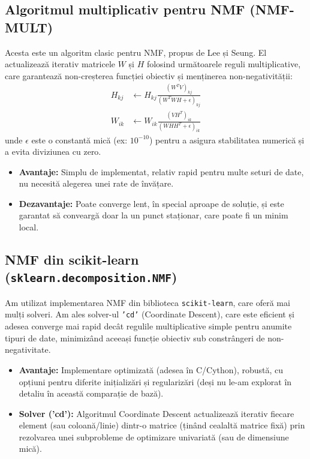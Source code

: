 \documentclass[12pt,a4paper]{article}
\begin{document}
	\subsection{Algoritmul multiplicativ pentru NMF (NMF-MULT)}
	Acesta este un algoritm clasic pentru NMF, propus de Lee și Seung. El actualizează iterativ matricele $W$ și $H$ folosind următoarele reguli multiplicative, care garantează non-creșterea funcției obiectiv și menținerea non-negativității:
	\begin{align}
		H_{kj} &\leftarrow H_{kj} \frac{(W^T V)_{kj}}{(W^T W H + \epsilon)_{kj}} \\
		W_{ik} &\leftarrow W_{ik} \frac{(V H^T)_{ik}}{(W H H^T + \epsilon)_{ik}}
	\end{align}
	unde $\epsilon$ este o constantă mică (ex: $10^{-10}$) pentru a asigura stabilitatea numerică și a evita diviziunea cu zero.
	\begin{itemize}
		\item \textbf{Avantaje:} Simplu de implementat, relativ rapid pentru multe seturi de date, nu necesită alegerea unei rate de învățare.
		\item \textbf{Dezavantaje:} Poate converge lent, în special aproape de soluție, și este garantat să conveargă doar la un punct staționar, care poate fi un minim local.
	\end{itemize}
	
	\subsection{NMF din scikit-learn (\texttt{sklearn.decomposition.NMF})}
	Am utilizat implementarea NMF din biblioteca \texttt{scikit-learn}, care oferă mai mulți solveri. Am ales solver-ul \texttt{'cd'} (Coordinate Descent), care este eficient și adesea converge mai rapid decât regulile multiplicative simple pentru anumite tipuri de date, minimizând aceeași funcție obiectiv sub constrângeri de non-negativitate.
	\begin{itemize}
		\item \textbf{Avantaje:} Implementare optimizată (adesea în C/Cython), robustă, cu opțiuni pentru diferite inițializări și regularizări (deși nu le-am explorat în detaliu în această comparație de bază).
		\item \textbf{Solver ('cd'):} Algoritmul Coordinate Descent actualizează iterativ fiecare element (sau coloană/linie) dintr-o matrice (ținând cealaltă matrice fixă) prin rezolvarea unei subprobleme de optimizare univariată (sau de dimensiune mică).
	\end{itemize}
	
\end{document}
